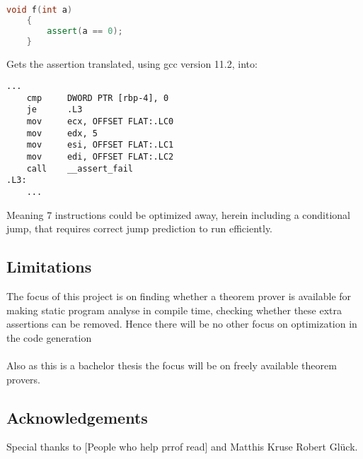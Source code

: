 \begin{lstlisting}[language=c++]
    void f(int a)
    {
        assert(a == 0);
    }
\end{lstlisting}
\noindent
Gets the assertion translated, using gcc version 11.2, into:

\begin{lstlisting}[language={[x86masm]Assembler}]
    ...
    cmp     DWORD PTR [rbp-4], 0
    je      .L3
    mov     ecx, OFFSET FLAT:.LC0
    mov     edx, 5
    mov     esi, OFFSET FLAT:.LC1
    mov     edi, OFFSET FLAT:.LC2
    call    __assert_fail
.L3:
    ...
\end{lstlisting}
\noindent
Meaning 7 instructions could be optimized away, herein including a conditional jump,
that requires correct jump prediction to run efficiently.

\subsection{Limitations \ms}
The focus of this project is on finding whether a theorem prover is available for making static
program analyse in compile time, checking whether these extra assertions can be removed. Hence
there will be no other focus on optimization in the code generation
\\
\\
Also as this is a bachelor thesis the focus will be on freely available theorem provers.

\subsection{Acknowledgements \ms}
Special thanks to [People who help prrof read] and Matthis Kruse
Robert Glück.